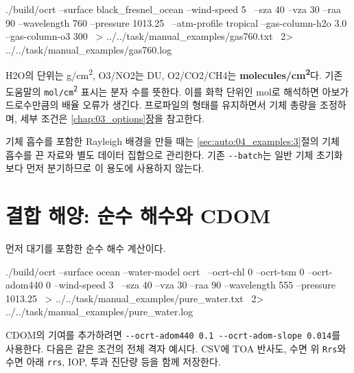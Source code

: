 \par\noindent\begin{minipage}{\linewidth}
\begin{ManualCode}
./build/ocrt --surface black_fresnel_ocean --wind-speed 5 \
  --sza 40 --vza 30 --raa 90 --wavelength 760 --pressure 1013.25 \
  --atm-profile tropical --gas-column-h2o 3.0 --gas-column-o3 300 \
  > ../../task/manual_examples/gas760.txt \
  2> ../../task/manual_examples/gas760.log
\end{ManualCode}
\end{minipage}\par

H2O의 단위는 g/cm\textsuperscript{2}, O3/NO2는 DU, O2/CO2/CH4는 \textbf{molecules/cm\textsuperscript{2}}다. 기존 도움말의 \texttt{mol/\allowbreak{}cm\textsuperscript{2}} 표시는 분자 수를 뜻한다. 이를 화학 단위인 mol로 해석하면 아보가드로수만큼의 배율 오류가 생긴다. 프로파일의 형태를 유지하면서 기체 총량을 조정하며, 세부 조건은 \hyperref[chap:03_options]{\ref*{chap:03_options}장}을 참고한다.

기체 흡수를 포함한 Rayleigh 배경을 만들 때는 \ref{sec:auto:04_examples:3}절의 기체 흡수를 끈 자료와 별도 데이터 집합으로 관리한다. 기존 \texttt{-\allowbreak{}-\allowbreak{}batch}는 일반 기체 초기화보다 먼저 분기하므로 이 용도에 사용하지 않는다.

\Needspace{17\baselineskip}
\section{결합 해양: 순수 해수와 CDOM}
\label{sec:auto:04_examples:7}
먼저 대기를 포함한 순수 해수 계산이다.


\par\noindent\begin{minipage}{\linewidth}
\begin{ManualCode}
./build/ocrt --surface ocean --water-model ocrt \
  --ocrt-chl 0 --ocrt-tsm 0 --ocrt-adom440 0 --wind-speed 3 \
  --sza 40 --vza 30 --raa 90 --wavelength 555 --pressure 1013.25 \
  > ../../task/manual_examples/pure_water.txt \
  2> ../../task/manual_examples/pure_water.log
\end{ManualCode}
\end{minipage}\par

CDOM의 기여를 추가하려면 \texttt{-\allowbreak{}-\allowbreak{}ocrt-\allowbreak{}adom440 0.\allowbreak{}1 -\allowbreak{}-\allowbreak{}ocrt-\allowbreak{}adom-\allowbreak{}slope 0.\allowbreak{}014}를 사용한다. 다음은 같은 조건의 전체 격자 예시다. CSV에 TOA 반사도, 수면 위 \texttt{Rrs}와 수면 아래 \texttt{rrs}, IOP, 투과 진단량 등을 함께 저장한다.


